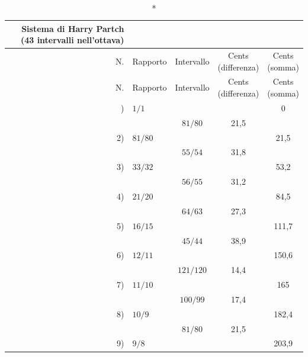 {\footnotesize
\begin{longtable}{r @{\;} l c c c}
  \caption*{Sistema di Harry Partch (43 intervalli nell'ottava)} \\
  \toprule
  N. & Rapporto & Intervallo & \makecell{Cents\\(differenza)} & \makecell{Cents\\(somma)} \\
  \midrule
  \endfirsthead
  \toprule
  N. & Rapporto & Intervallo & \makecell{Cents\\(differenza)} & \makecell{Cents\\(somma)} \\
  \midrule
  \endhead
  \midrule \endfoot
  \bottomrule \endlastfoot
  1) & $1/1$ &           &      & 0 \\
  \cmidrule(lr){1-2}\cmidrule(lr){5-5}
     &           & $81/80$ & 21,5 &       \\
  \cmidrule(lr){3-4}
  2) & $81/80$ &           &      & 21,5 \\
  \cmidrule(lr){1-2}\cmidrule(lr){5-5}
     &           & $55/54$ & 31,8 &       \\
  \cmidrule(lr){3-4}
  3) & $33/32$ &           &      & 53,2 \\
  \cmidrule(lr){1-2}\cmidrule(lr){5-5}
     &           & $56/55$ & 31,2 &       \\
  \cmidrule(lr){3-4}
  4) & $21/20$ &           &      & 84,5 \\
  \cmidrule(lr){1-2}\cmidrule(lr){5-5}
     &           & $64/63$ & 27,3 &       \\
  \cmidrule(lr){3-4}
  5) & $16/15$ &           &      & 111,7 \\
  \cmidrule(lr){1-2}\cmidrule(lr){5-5}
     &           & $45/44$ & 38,9 &       \\
  \cmidrule(lr){3-4}
  6) & $12/11$ &           &      & 150,6 \\
  \cmidrule(lr){1-2}\cmidrule(lr){5-5}
     &           & $121/120$ & 14,4 &       \\
  \cmidrule(lr){3-4}
  7) & $11/10$ &           &      & 165 \\
  \cmidrule(lr){1-2}\cmidrule(lr){5-5}
     &           & $100/99$ & 17,4 &       \\
  \cmidrule(lr){3-4}
  8) & $10/9$ &           &      & 182,4 \\
  \cmidrule(lr){1-2}\cmidrule(lr){5-5}
     &           & $81/80$ & 21,5 &       \\
  \cmidrule(lr){3-4}
  9) & $9/8$ &           &      & 203,9 \\

\end{longtable}}
